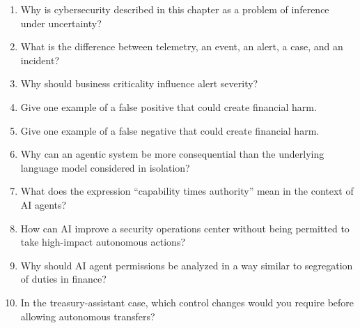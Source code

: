 \begin{enumerate}
    \item Why is cybersecurity described in this chapter as a problem of inference under uncertainty?
    \item What is the difference between telemetry, an event, an alert, a case, and an incident?
    \item Why should business criticality influence alert severity?
    \item Give one example of a false positive that could create financial harm.
    \item Give one example of a false negative that could create financial harm.
    \item Why can an agentic system be more consequential than the underlying language model considered in isolation?
    \item What does the expression ``capability times authority'' mean in the context of AI agents?
    \item How can AI improve a security operations center without being permitted to take high-impact autonomous actions?
    \item Why should AI agent permissions be analyzed in a way similar to segregation of duties in finance?
    \item In the treasury-assistant case, which control changes would you require before allowing autonomous transfers?
\end{enumerate}

